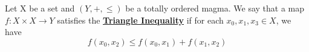 \label{def:TriangleInequality}
\newcommand{\TriangleInequality}[0]{\textbf{\hyperref[def:TriangleInequality]{Triangle Inequality}}\xspace}
\begin{df}
    
    Let X be a set and $(Y,+, \leq)$ be a totally ordered magma.
    We say that a map $f:X \times X \to Y$ satisfies the \TriangleInequality if for each $x_0,x_1,x_3 \in X$, we have
    \begin{equation*}
        f(x_0,x_2) \leq  f(x_0,x_1)+f(x_1,x_2)
        \end{equation*}
\end{df} 
